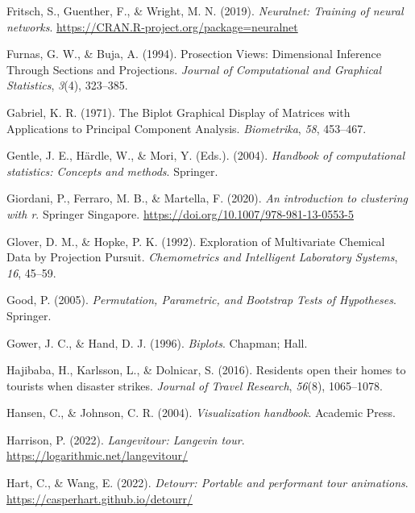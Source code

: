 \documentclass[
  letterpaper,
]{krantz}
\newlength{\cslhangindent}
\newlength{\cslentryspacingunit} %
\newenvironment{CSLReferences}[2] %
 {%
  \setlength{\parindent}{0pt}
  \ifodd #1
  \let\oldpar\par
  \def\par{\hangindent=\cslhangindent\oldpar}
  \fi
  \setlength{\parskip}{#2\cslentryspacingunit}
 }%
 {}
\begin{document}
\begin{CSLReferences}{1}{0}
\leavevmode{}%
Fritsch, S., Guenther, F., \& Wright, M. N. (2019). \emph{Neuralnet:
Training of neural networks}.
\url{https://CRAN.R-project.org/package=neuralnet}

\leavevmode{}%
Furnas, G. W., \& Buja, A. (1994). Prosection {V}iews: {D}imensional
{I}nference {T}hrough {S}ections and {P}rojections. \emph{Journal of
Computational and Graphical Statistics}, \emph{3}(4), 323--385.

\leavevmode{}%
Gabriel, K. R. (1971). The {B}iplot {G}raphical {D}isplay of {M}atrices
with {A}pplications to {P}rincipal {C}omponent {A}nalysis.
\emph{Biometrika}, \emph{58}, 453--467.

\leavevmode{}%
Gentle, J. E., Härdle, W., \& Mori, Y. (Eds.). (2004). \emph{Handbook of
computational statistics: Concepts and methods}. Springer.

\leavevmode{}%
Giordani, P., Ferraro, M. B., \& Martella, F. (2020). \emph{An
introduction to clustering with r}. Springer Singapore.
\url{https://doi.org/10.1007/978-981-13-0553-5}

\leavevmode{}%
Glover, D. M., \& Hopke, P. K. (1992). {E}xploration of {M}ultivariate
{C}hemical {D}ata by {P}rojection {P}ursuit. \emph{Chemometrics and
Intelligent Laboratory Systems}, \emph{16}, 45--59.

\leavevmode{}%
Good, P. (2005). \emph{Permutation, {P}arametric, and {B}ootstrap
{T}ests of {H}ypotheses}. Springer.

\leavevmode{}%
Gower, J. C., \& Hand, D. J. (1996). \emph{Biplots}. Chapman; Hall.

\leavevmode{}%
Hajibaba, H., Karlsson, L., \& Dolnicar, S. (2016). Residents open their
homes to tourists when disaster strikes. \emph{Journal of Travel
Research}, \emph{56}(8), 1065--1078.

\leavevmode{}%
Hansen, C., \& Johnson, C. R. (2004). \emph{Visualization handbook}.
Academic Press.

\leavevmode{}%
Harrison, P. (2022). \emph{Langevitour: Langevin tour}.
\url{https://logarithmic.net/langevitour/}

\leavevmode{}%
Hart, C., \& Wang, E. (2022). \emph{Detourr: Portable and performant
tour animations}. \url{https://casperhart.github.io/detourr/}


\end{CSLReferences}
\end{document}
